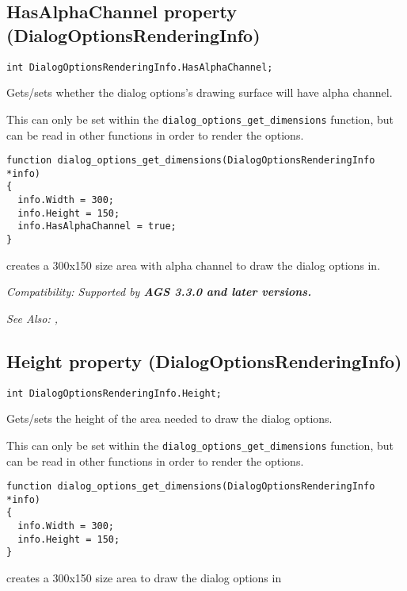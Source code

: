 \subsection{HasAlphaChannel property (DialogOptionsRenderingInfo)}\label{DialogOptionsRenderingInfo.HasAlphaChannel}%

\begin{verbatim}
int DialogOptionsRenderingInfo.HasAlphaChannel;
\end{verbatim}
Gets/sets whether the dialog options's drawing surface will have alpha channel.

This can only be set within the \verb$dialog_options_get_dimensions$ function, but
can be read in other functions in order to render the options.

\begin{verbatim}
function dialog_options_get_dimensions(DialogOptionsRenderingInfo *info)
{
  info.Width = 300;
  info.Height = 150;
  info.HasAlphaChannel = true;
}
\end{verbatim}
creates a 300x150 size area with alpha channel to draw the dialog options in.

\it{Compatibility:} Supported by \bf{AGS 3.3.0} and later versions.

\it{See Also:}
,


\subsection{Height property (DialogOptionsRenderingInfo)}\label{DialogOptionsRenderingInfo.Height}%

\begin{verbatim}
int DialogOptionsRenderingInfo.Height;
\end{verbatim}
Gets/sets the height of the area needed to draw the dialog options.

This can only be set within the \verb$dialog_options_get_dimensions$ function, but
can be read in other functions in order to render the options.

\begin{verbatim}
function dialog_options_get_dimensions(DialogOptionsRenderingInfo *info)
{
  info.Width = 300;
  info.Height = 150;
}
\end{verbatim}
creates a 300x150 size area to draw the dialog options in

